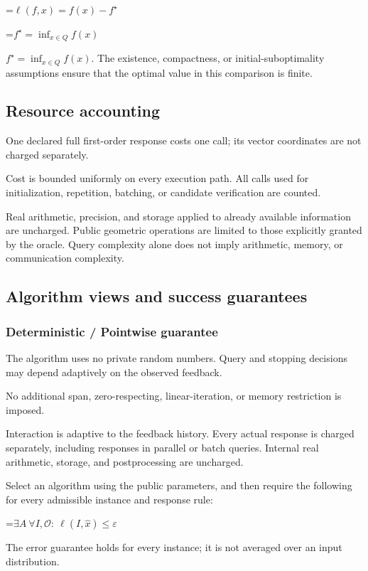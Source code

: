 \documentclass[10pt,a4paper]{article}
\newcommand{\AtlasMath}[1]{\par\begingroup\centering\setbox0=\hbox{$\displaystyle #1$}\ifdim\wd0>1.4\linewidth\typeout{ATLAS WIDE FORMULA: \the\wd0}\fi\ifdim\wd0>\linewidth\resizebox{\linewidth}{!}{\box0}\else\box0\fi\par\endgroup}
\newcommand{\AtlasInlineMath}[1]{\begingroup\setbox0=\hbox{$#1$}\ifdim\wd0>.4\linewidth\endgroup\AtlasMath{#1}\else\endgroup$#1$\fi}
\begin{document}
\AtlasMath{\ell(f,x)=f(x)-f^\star}


\AtlasInlineMath{f^\star=\inf_{x\in Q}f(x)}. The existence, compactness, or initial-suboptimality assumptions ensure that the optimal value in this comparison is finite.

\subsection{Resource accounting}
One declared full first-order response costs one call; its vector coordinates are not charged separately.

Cost is bounded uniformly on every execution path. All calls used for initialization, repetition, batching, or candidate verification are counted.

Real arithmetic, precision, and storage applied to already available information are uncharged. Public geometric operations are limited to those explicitly granted by the oracle. Query complexity alone does not imply arithmetic, memory, or communication complexity.

\subsection{Algorithm views and success guarantees}
\subsubsection{Deterministic / Pointwise guarantee}
The algorithm uses no private random numbers. Query and stopping decisions may depend adaptively on the observed feedback.

No additional span, zero-respecting, linear-iteration, or memory restriction is imposed.

Interaction is adaptive to the feedback history. Every actual response is charged separately, including responses in parallel or batch queries. Internal real arithmetic, storage, and postprocessing are uncharged.

Select an algorithm using the public parameters, and then require the following for every admissible instance and response rule:


\AtlasMath{\exists A\ \forall I,\mathcal{O}:\ \ell(I,\widehat{x})\le\varepsilon}


The error guarantee holds for every instance; it is not averaged over an input distribution.
\end{document}
